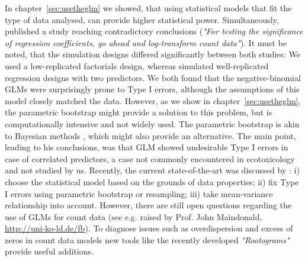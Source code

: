 In chapter~\ref{sec:usetheglm} we showed, that using statistical models that fit the type of data analysed, can provide higher statistical power.
Simultaneously, \citet{ives_for_2015} published a study reaching contradictory conclusions (\emph{"For testing the significance of regression coefficients, go ahead and log-transform count data"}). 
It must be noted, that the simulation designs differed significantly between both studies: We used a low-replicated factorials design, whereas \citet{ives_for_2015} simulated well-replicated regression designs with two predictors.
We both found that the negative-binomial GLMs were surprisingly prone to Type I errors, although the assumptions of this model closely matched the data.
However, as we show in chapter~\ref{sec:usetheglm}, the parametric bootstrap might provide a solution to this problem, but is computationally intensive and not widely used.
The parametric bootstrap is akin to Bayesian methods \citep{gelman_bayesian_2014}, which might also provide an alternative.
The main point, leading \citet{ives_for_2015} to his conclusions, was that GLM showed undesirable Type I errors in case of correlated predictors, a case not commonly encountered in ecotoxicology and not studied by us.
Recently, the current state-of-the-art was discussed by \citet{warton_three_2016}: i) choose the statistical model based on the grounds of data properties; ii) fix Type I errors using parametric bootstrap or resampling; iii) take mean-variance relationship into account.
However, there are still open questions regarding the use of GLMs for count data (see e.g. raised by Prof. John Maindonald, \url{http://uni-ko-ld.de/fb}).
To diagnose issues such as overdispersion and excess of zeros in count data models new tools like the recently developed \emph{"Rootograms"} \citep{kleiber_visualizing_2016} provide useful additions.

